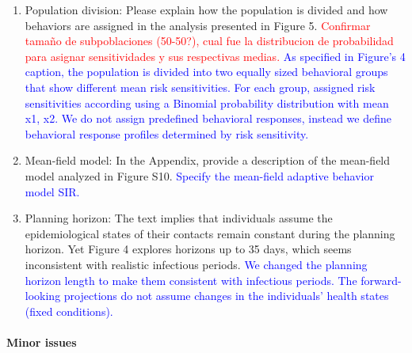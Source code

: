 \documentclass{article}
\newcommand{\blue}[1]{{\textcolor{blue}{#1}}}
\newcommand{\red}[1]{{\textcolor{red}{#1}}}
\begin{document}
\begin{enumerate}
\begin{enumerate}
        \item Population division: Please explain how the population is divided and how behaviors are assigned in the analysis presented in Figure 5.
        \red{Confirmar tamaño de subpoblaciones (50-50?), cual fue la distribucion de probabilidad para asignar sensitividades y sus respectivas medias.}
        \blue{
        As specified in Figure's 4 caption, the population is divided into two equally sized behavioral groups that show different mean risk sensitivities. For each group, assigned risk sensitivities according using a Binomial probability distribution with mean x1, x2.
        We do not assign predefined behavioral responses, instead we define behavioral response profiles determined by risk sensitivity.
        }

        \item Mean-field model: In the Appendix, provide a description of the mean-field model analyzed in Figure S10.
        \blue{
        Specify the mean-field adaptive behavior model SIR.
        }

        \item Planning horizon: The text implies that individuals assume the epidemiological states of their contacts remain constant during the planning horizon. Yet Figure 4 explores horizons up to 35 days, which seems inconsistent with realistic infectious periods.
        \blue{
        We changed the planning horizon length to make them consistent with infectious periods. The forward-looking projections do not assume changes in the individuals' health states (fixed conditions).
        }
    \end{enumerate}
    
\end{enumerate}

\paragraph{Minor issues}
\end{document}
